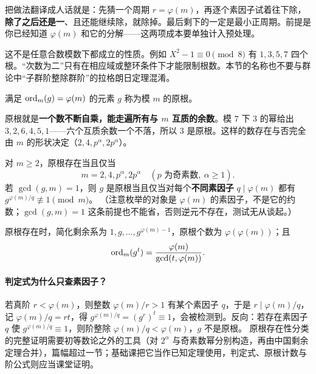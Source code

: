 \begin{tip}
把做法翻译成人话就是：先猜一个周期 $r=\varphi(m)$，再逐个素因子试着往下除，\textbf{除了之后还是一}、且还能继续除，就除掉。最后剩下的一定是最小正周期。前提是你已经知道 $\varphi(m)$ 和它的分解——这两项成本要单独计入预处理。
\end{tip}


\begin{pitfall}
这不是任意合数模数下都成立的性质。例如 $X^2-1\equiv0\pmod8$ 有 $1,3,5,7$ 四个根。“次数为二”只有在相应域或整环条件下才能限制根数。本节的名称也不要与群论中“子群阶整除群阶”的拉格朗日定理混淆。
\end{pitfall}


\begin{definition}
满足 $\operatorname{ord}_m(g)=\varphi(m)$ 的元素 $g$ 称为模 $m$ 的原根。
\end{definition}

\begin{tip}[原根一句话]
原根就是\textbf{一个数不断自乘，能走遍所有与 $m$ 互质的余数}。模 $7$ 下 $3$ 的幂给出 $3,2,6,4,5,1$——六个互质余数一个不落，所以 $3$ 是原根。这样的数存在与否完全由 $m$ 的形状决定（$2,4,p^\alpha,2p^\alpha$）。
\end{tip}

\begin{theorem}
对 $m\ge2$，原根存在当且仅当
\[
 m=2,4,p^\alpha,2p^\alpha\quad(p\text{ 为奇素数},\ \alpha\ge1).
\]
若 $\gcd(g,m)=1$，则 $g$ 是原根当且仅当对每个\textbf{不同素因子} $q\mid\varphi(m)$ 都有 $g^{\varphi(m)/q}\not\equiv1\pmod m$。
（注意枚举的对象是 $\varphi(m)$ 的素因子，不是它的约数；$\gcd(g,m)=1$ 这条前提也不能省，否则逆元不存在，测试无从谈起。）
\end{theorem}
原根存在时，简化剩余系为 $1,g,\ldots,g^{\varphi(m)-1}$，原根个数为 $\varphi(\varphi(m))$；且
\[
 \operatorname{ord}_m(g^t)=\frac{\varphi(m)}{\gcd(t,\varphi(m))}.
\]

\paragraph{判定式为什么只查素因子？}
若真阶 $r<\varphi(m)$，则整数 $\varphi(m)/r>1$ 有某个素因子 $q$，于是 $r\mid\varphi(m)/q$，记 $\varphi(m)/q=rt$，得 $g^{\varphi(m)/q}=(g^r)^t\equiv1$，会被检测到。反向：若存在素因子 $q$ 使 $g^{\varphi(m)/q}\equiv1$，则阶整除 $\varphi(m)/q<\varphi(m)$，$g$ 不是原根。
原根存在性分类的完整证明需要初等数论之外的工具（对 $2^\alpha$ 与奇素数幂分别构造，再由中国剩余定理合并），篇幅超过一节；基础课把它当作已知定理使用，判定式、原根计数与阶公式则应当课堂证明。
